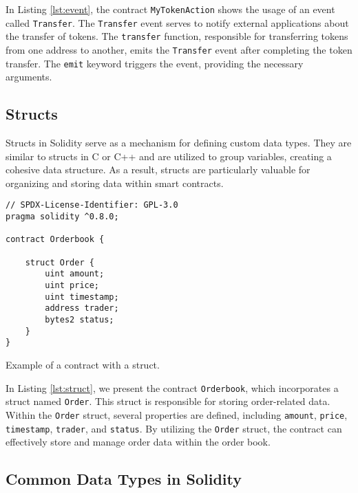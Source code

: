 In Listing \ref{lst:event}, the contract \texttt{MyTokenAction} shows the usage of an event called \texttt{Transfer}. The \texttt{Transfer} event serves to notify external applications about the transfer of tokens. The \texttt{transfer} function, responsible for transferring tokens from one address to another, emits the
\texttt{Transfer} event after completing the token transfer. The \texttt{emit} keyword triggers the event, providing the necessary arguments.


\subsection{Structs}

Structs in Solidity serve as a mechanism for defining custom data types. They are similar to structs in C or C++ and are utilized to group variables, creating a cohesive 
data structure. As a result, structs are particularly valuable for organizing and storing data within smart contracts.


\begin{listing}[!ht]
    \begin{verbatim}
// SPDX-License-Identifier: GPL-3.0
pragma solidity ^0.8.0;

contract Orderbook {

    struct Order {
        uint amount;
        uint price;
        uint timestamp;
        address trader;
        bytes2 status;
    }
}
    \end{verbatim}
    \caption{Example of a contract with a struct.}
    \label{lst:struct}
\end{listing}

In Listing \ref{lst:struct}, we present the contract \texttt{Orderbook}, which incorporates a struct named \texttt{Order}. 
This struct is responsible for storing order-related data. Within the \texttt{Order} struct, several properties are defined, including \texttt{amount}, \texttt{price}, 
\texttt{timestamp}, \texttt{trader}, and \texttt{status}. By utilizing the \texttt{Order} struct, the contract can effectively store and manage order data within the 
order book.


\subsection{Common Data Types in Solidity}

